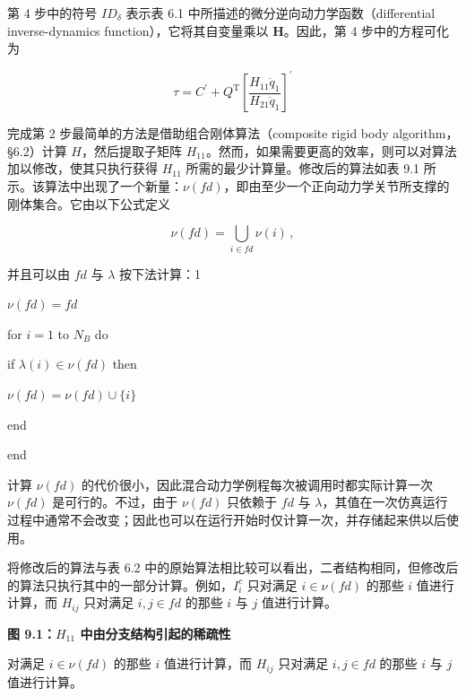 \documentclass[10pt,a4paper]{book}
\theoremstyle{thmstyle} %
\theoremstyle{defstyle} %
\theoremstyle{prostyle} %
\begin{document}
第 4 步中的符号 $ID_{\delta}$ 表示表 6.1 中所描述的微分逆向动力学函数（differential inverse-dynamics function），它将其自变量乘以 $\mathbf{H}$。因此，第 4 步中的方程可化为



$$
\tau = C ^{\prime} + Q ^{\mathrm { T} } \left[ \frac { H _ { 11 } \ddot { q } _ { 1 } } { H _ { 21 } \ddot { q } _ { 1 } } \right] ^{\prime}
$$



完成第 2 步最简单的方法是借助组合刚体算法（composite rigid body algorithm，§6.2）计算 $H$，然后提取子矩阵 $H_{11}$。然而，如果需要更高的效率，则可以对算法加以修改，使其只执行获得 $H_{11}$ 所需的最少计算量。修改后的算法如表 9.1 所示。该算法中出现了一个新量：$\nu(fd)$，即由至少一个正向动力学关节所支撑的刚体集合。它由以下公式定义



$$
\nu ( f d ) = \bigcup _ { i \in f d } \nu ( i ) \, ,
$$



并且可以由 $fd$ 与 $\lambda$ 按下法计算：1



$\nu(fd)=fd$



for $i=1$ to $N_{B}$ do



if $\lambda(i)\in\nu(fd)$ then



$\nu(fd)=\nu(fd)\cup\{i\}$



end



end



计算 $\nu(fd)$ 的代价很小，因此混合动力学例程每次被调用时都实际计算一次 $\nu(fd)$ 是可行的。不过，由于 $\nu(fd)$ 只依赖于 $fd$ 与 $\lambda$，其值在一次仿真运行过程中通常不会改变；因此也可以在运行开始时仅计算一次，并存储起来供以后使用。



将修改后的算法与表 6.2 中的原始算法相比较可以看出，二者结构相同，但修改后的算法只执行其中的一部分计算。例如，$I_{i}^{c}$ 只对满足 $i \in \nu(fd)$ 的那些 $i$ 值进行计算，而 $H_{ij}$ 只对满足 $i, j \in fd$ 的那些 $i$ 与 $j$ 值进行计算。



\noindent\textbf{图 9.1：$H_{11}$ 中由分支结构引起的稀疏性}





对满足 $i \in \nu(fd)$ 的那些 $i$ 值进行计算，而 $H_{ij}$ 只对满足 $i, j \in fd$ 的那些 $i$ 与 $j$ 值进行计算。
\end{document}
